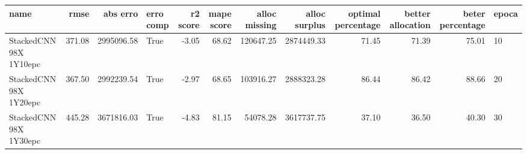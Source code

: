 \begin{tabular}{lrrlrrrrrrrl}
\toprule
name & rmse & abs erro & erro comp & r2 score & mape score & alloc missing & alloc surplus & optimal percentage & better allocation & beter percentage & epoca \\
\midrule
StackedCNN 98X 1Y10epc & 371.08 & 2995096.58 & True & -3.05 & 68.62 & 120647.25 & 2874449.33 & 71.45 & 71.39 & 75.01 & 10 \\
StackedCNN 98X 1Y20epc & 367.50 & 2992239.54 & True & -2.97 & 68.65 & 103916.27 & 2888323.28 & 86.44 & 86.42 & 88.66 & 20 \\
StackedCNN 98X 1Y30epc & 445.28 & 3671816.03 & True & -4.83 & 81.15 & 54078.28 & 3617737.75 & 37.10 & 36.50 & 40.30 & 30 \\
\bottomrule
\end{tabular}
